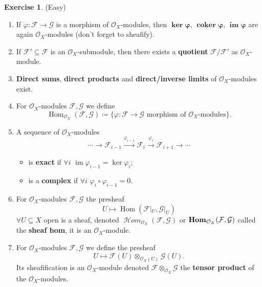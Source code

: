 \documentclass[12pt]{article}
\DeclareMathOperator{\im}{im}
\DeclareMathOperator{\coker}{coker}
\DeclareMathOperator{\Hom}{Hom}
\DeclareMathOperator{\shHom}{\mathcal{H}\textit{om}}
\DeclareMathOperator{\HOM}{\textnormal{\textbf{Hom}}}
\theoremstyle{definition}
\newtheorem*{exercise}{Exercise}
\begin{document}
\begin{exercise}
(Easy)
\begin{enumerate}[label=\arabic*)]
\item If $\varphi:\mathcal{F}\rightarrow\mathcal{G}$ is a morphism of $\mathcal{O}_X$-modules, then $\boldsymbol{\ker\varphi}$, $\boldsymbol{\coker\varphi}$, $\boldsymbol{\im\varphi}$ are again $\mathcal{O}_X$-modules (don't forget to sheafify).

\item If $\mathcal{F}'\subseteq\mathcal{F}$ is an $\mathcal{O}_X$-submodule, then there exists a \textbf{quotient} $\mathcal{F}/\mathcal{F}'$ as $\mathcal{O}_X$-module.

\item \textbf{Direct sums}, \textbf{direct products} and \textbf{direct/inverse limits} of $\mathcal{O}_X$-modules exist.

\item For $\mathcal{O}_X$-modules $\mathcal{F},\mathcal{G}$ we define
\[\Hom_{\mathcal{O}_X}(\mathcal{F},\mathcal{G})\coloneqq\{\varphi:\mathcal{F}\rightarrow\mathcal{G}\text{ morphism of }\mathcal{O}_X\text{-modules}\}.\]

\item A sequence of $\mathcal{O}_X$-modules
\[\cdots\longrightarrow\mathcal{F}_{i-1}\xrightarrow{\varphi_{i-1}}\mathcal{F}_i\overset{\varphi_i}{\longrightarrow}\mathcal{F}_{i+1}\longrightarrow\cdots\]
\begin{itemize}
\item is \textbf{exact} if $\forall i$ $\im\varphi_{i-1}=\ker\varphi_i$;
\item is a \textbf{complex} if $\forall i$ $\varphi_i\circ\varphi_{i-1}=0$.
\end{itemize}

\item For $\mathcal{O}_X$-modules $\mathcal{F},\mathcal{G}$ the presheaf
\[U\longmapsto\Hom(\mathcal{F}|_U,\mathcal{G}|_U)\]
$\forall U\subseteq X$ open is a sheaf, denoted $\shHom_{\mathcal{O}_X}(\mathcal{F},\mathcal{G})$ or $\HOM_{\mathcal{O}_X}(\mathcal{F},\mathcal{G})$ called the \textbf{sheaf hom}, it is an $\mathcal{O}_X$-module.

\item For $\mathcal{O}_X$-modules $\mathcal{F},\mathcal{G}$ we define the presheaf
\[U\longmapsto\mathcal{F}(U)\otimes_{\mathcal{O}_X(U)}\mathcal{G}(U).\]
Its sheafification is an $\mathcal{O}_X$-module denoted $\mathcal{F}\otimes_{\mathcal{O}_X}\mathcal{G}$ the \textbf{tensor product} of the $\mathcal{O}_X$-modules.
\end{enumerate}
\end{exercise}
\end{document}
